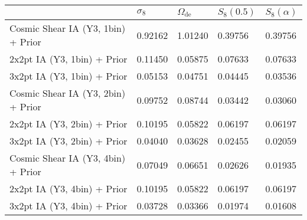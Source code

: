 \begin{tabular}{lllll}
\toprule
{} & $\sigma_8$ & $\Omega_\mathrm{de}$ & $S_8(0.5)$ & $S_8(\alpha)$ \\
\midrule
Cosmic Shear IA (Y3, 1bin) + Prior &    0.92162 &              1.01240 &    0.39756 &       0.39756 \\
2x2pt IA (Y3, 1bin) + Prior        &    0.11450 &              0.05875 &    0.07633 &       0.07633 \\
3x2pt IA (Y3, 1bin) + Prior        &    0.05153 &              0.04751 &    0.04445 &       0.03536 \\
Cosmic Shear IA (Y3, 2bin) + Prior &    0.09752 &              0.08744 &    0.03442 &       0.03060 \\
2x2pt IA (Y3, 2bin) + Prior        &    0.10195 &              0.05822 &    0.06197 &       0.06197 \\
3x2pt IA (Y3, 2bin) + Prior        &    0.04040 &              0.03628 &    0.02455 &       0.02059 \\
Cosmic Shear IA (Y3, 4bin) + Prior &    0.07049 &              0.06651 &    0.02626 &       0.01935 \\
2x2pt IA (Y3, 4bin) + Prior        &    0.10195 &              0.05822 &    0.06197 &       0.06197 \\
3x2pt IA (Y3, 4bin) + Prior        &    0.03728 &              0.03366 &    0.01974 &       0.01608 \\
\bottomrule
\end{tabular}
